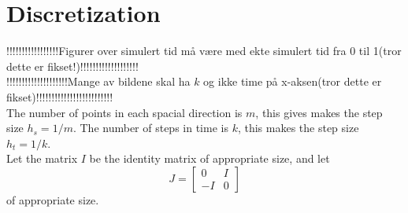 \section{Discretization}
!!!!!!!!!!!!!!!!!Figurer over simulert tid må være med ekte simulert tid fra 0 til 1(tror dette er fikset!)!!!!!!!!!!!!!!!!!!!\\
!!!!!!!!!!!!!!!!!!!!Mange av bildene skal ha $k$ og ikke time på x-aksen(tror dette er fikset)!!!!!!!!!!!!!!!!!!!!!!!!!\\

The number of points in each spacial direction is $m$, this gives makes the step size $h_s = 1/m$. The number of steps in time is $k$, this makes the step size $h_t = 1/k$.\\

Let the matrix $I$ be the identity matrix of appropriate size, and let 
\begin{equation}
J = 
\begin{bmatrix}
0&I\\-I&0
\end{bmatrix}
\end{equation}
of appropriate size.\\

